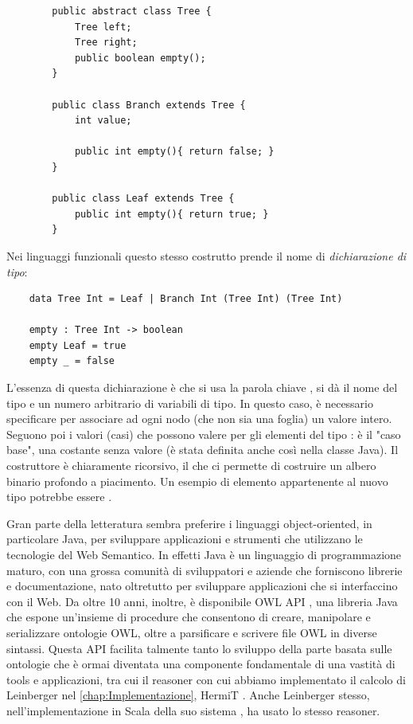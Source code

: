 \begin{verbatim}
		public abstract class Tree {
			Tree left;
			Tree right;
			public boolean empty();
		}
		
		public class Branch extends Tree {
			int value;
		
			public int empty(){ return false; }
		}
		
		public class Leaf extends Tree {	
			public int empty(){ return true; }
		}
\end{verbatim}
Nei linguaggi funzionali questo stesso costrutto prende il nome di \textit{dichiarazione di tipo}:
\begin{verbatim}
	data Tree Int = Leaf | Branch Int (Tree Int) (Tree Int)
	
	empty : Tree Int -> boolean
	empty Leaf = true
	empty _ = false
\end{verbatim}
L'essenza di questa dichiarazione è che si usa la parola chiave , si dà il nome del tipo e un numero arbitrario di variabili di tipo. In questo caso, è necessario specificare  per associare ad ogni nodo (che non sia una foglia) un valore intero. Seguono poi i valori (casi) che possono valere per gli elementi del tipo :  è il "caso base", una costante senza valore (è stata definita anche così nella classe Java). Il costruttore  è chiaramente ricorsivo, il che ci permette di costruire un albero binario profondo a piacimento. Un esempio di elemento appartenente al nuovo tipo  potrebbe essere .

Gran parte della letteratura sembra preferire i linguaggi object-oriented, in particolare Java, per sviluppare applicazioni e strumenti che utilizzano le tecnologie del Web Semantico. In effetti Java è un linguaggio di programmazione maturo, con una grossa comunità di sviluppatori e aziende che forniscono librerie e documentazione, nato oltretutto per sviluppare applicazioni che si interfaccino con il Web. Da oltre 10 anni, inoltre, è disponibile OWL API \cite{OWLAPI}, una libreria Java che espone un'insieme di procedure che consentono di creare, manipolare e serializzare ontologie OWL, oltre a parsificare e scrivere file OWL in diverse sintassi. Questa API facilita talmente tanto lo sviluppo della parte basata sulle ontologie che è ormai diventata una componente fondamentale di una vastità di tools e applicazioni, tra cui il reasoner con cui abbiamo implementato il calcolo di Leinberger nel \autoref{chap:Implementazione}, HermiT \cite{HermiTWhitepaper}. Anche Leinberger stesso, nell'implementazione in Scala della suo sistema \cite{leinbergerScalaImpl}, ha usato lo stesso reasoner. 

